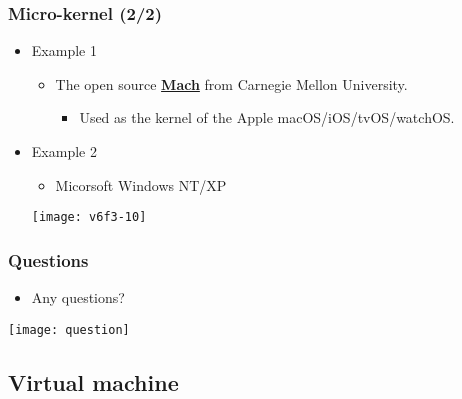 \documentclass[CJKutf8,dvipsnames,table]{beamer}
\begin{document}
\begin{CJK*}{UTF8}{song}
  \begin{frame}
    \frametitle{Micro-kernel (2/2)} \pause
    \begin{itemize}
    \item Example 1  \pause
      \begin{itemize}
      \item The open source \href{https://www.cs.cmu.edu/afs/cs/project/mach/public/www/mach.html}{\textbf{Mach}} from Carnegie Mellon University.  \pause
        \begin{itemize}
        \item Used as the kernel of the Apple macOS/iOS/tvOS/watchOS.  \pause
        \end{itemize}
      \end{itemize}
    \item Example 2  \pause
      \begin{itemize}
      \item Micorsoft Windows NT/XP  \pause
      \end{itemize}
      \begin{center}
        \texttt{[image: v6f3-10]}
      \end{center}
    \end{itemize}
  \end{frame}
  
  \begin{frame}
    \frametitle{Questions}
    \begin{itemize}
    \item Any questions? 
    \end{itemize}
    \begin{center}
      \texttt{[image: question]}
    \end{center}
  \end{frame}
  
  \subsection{Virtual machine}


\end{CJK*}
\end{document}
